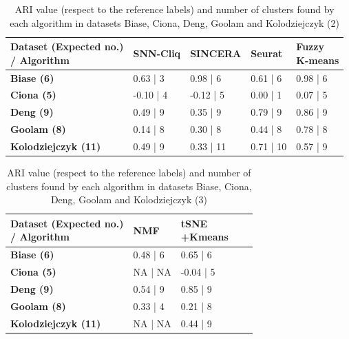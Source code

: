 \documentclass{report}
\begin{document}
{\begin{table}[H]
\centering
\caption{ARI value (respect to the reference labels) and number of clusters found by each algorithm in datasets Biase, Ciona, Deng, Goolam and Kolodziejczyk (2)}
\begin{tabular}{| l | l | l | l | l |}
\hline
\parbox[c]{5cm}{\textbf{Dataset (Expected no.)\\ / Algorithm}} & 
\parbox[c]{2cm}{\textbf{SNN-Cliq}}&
\parbox[c]{2cm}{\textbf{SINCERA}}&
\parbox[c]{2cm}{\textbf{Seurat}}&
\parbox[c]{2cm}{\textbf{Fuzzy\\K-means}}\\
\hline
\parbox[c]{5cm}{\textbf{Biase (6)}} & 
\parbox[c]{2cm}{0.63 | 3}&
\parbox[c]{2cm}{0.98 | 6}&
\parbox[c]{2cm}{0.61 | 6}&
\parbox[c]{2cm}{0.98 | 6}\\
\hline
\parbox[c]{5cm}{\textbf{Ciona (5)}} & 
\parbox[c]{2cm}{-0.10 | 4}&
\parbox[c]{2cm}{-0.12 | 5}&
\parbox[c]{2cm}{0.00 | 1}&
\parbox[c]{2cm}{0.07 | 5}\\
\hline
\parbox[c]{5cm}{\textbf{Deng (9)}} & 
\parbox[c]{2cm}{0.49 | 9}&
\parbox[c]{2cm}{0.35 | 9}&
\parbox[c]{2cm}{0.79 | 9}&
\parbox[c]{2cm}{0.86 | 9}\\
\hline
\parbox[c]{5cm}{\textbf{Goolam (8)}} & 
\parbox[c]{2cm}{0.14 | 8}&
\parbox[c]{2cm}{0.30 | 8}&
\parbox[c]{2cm}{0.44 | 8}&
\parbox[c]{2cm}{0.78 | 8}\\
\hline
\parbox[c]{5cm}{\textbf{Kolodziejczyk (11)}} & 
\parbox[c]{2cm}{0.49 | 9}&
\parbox[c]{2cm}{0.33 | 11}&
\parbox[c]{2cm}{0.71 | 10}&
\parbox[c]{2cm}{0.57 | 9}\\
\hline
\end{tabular}
\label{numberclusters12}
\end{table}

\begin{table}[H]
\centering
\caption{ARI value (respect to the reference labels) and number of clusters found by each algorithm in datasets Biase, Ciona, Deng, Goolam and Kolodziejczyk (3)}
\begin{tabular}{| l | l | l | l | l |}
\hline
\parbox[c]{5cm}{\textbf{Dataset (Expected no.)\\ / Algorithm}} & 
\parbox[c]{2cm}{\textbf{NMF}}&
\parbox[c]{2cm}{\textbf{tSNE\\+Kmeans}}\\
\hline
\parbox[c]{5cm}{\textbf{Biase (6)}} & 
\parbox[c]{2cm}{0.48 | 6}&
\parbox[c]{2cm}{0.65 | 6}\\
\hline
\parbox[c]{5cm}{\textbf{Ciona (5)}} & 
\parbox[c]{2cm}{NA | NA}&
\parbox[c]{2cm}{-0.04 | 5}\\
\hline
\parbox[c]{5cm}{\textbf{Deng (9)}} & 
\parbox[c]{2cm}{0.54 | 9}&
\parbox[c]{2cm}{0.85 | 9}\\
\hline
\parbox[c]{5cm}{\textbf{Goolam (8)}} & 
\parbox[c]{2cm}{0.33 | 4}&
\parbox[c]{2cm}{0.21 | 8}\\
\hline
\parbox[c]{5cm}{\textbf{Kolodziejczyk (11)}} & 
\parbox[c]{2cm}{NA | NA}&
\parbox[c]{2cm}{0.44 | 9}\\
\hline
\end{tabular}
\label{numberclusters13}
\end{table}

}
\end{document}
